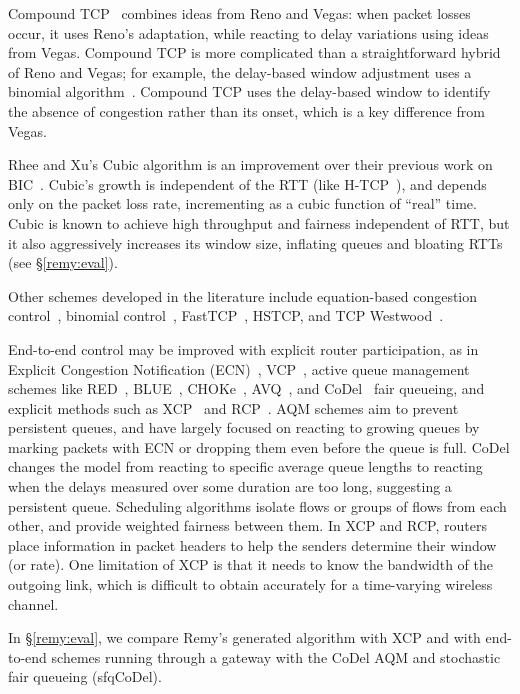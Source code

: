 Compound TCP~\cite{compound} combines ideas from Reno and Vegas: when
packet losses occur, it uses Reno's adaptation, while reacting to
delay variations using ideas from Vegas. Compound TCP is more
complicated than a straightforward hybrid of Reno and Vegas; for
example, the delay-based window adjustment uses a binomial
algorithm~\cite{binomial}. Compound TCP uses the delay-based window to
identify the absence of congestion rather than its onset, which is a
key difference from Vegas.

Rhee and Xu's Cubic algorithm is an improvement over their previous
work on BIC~\cite{bic}. Cubic's growth is independent of the RTT (like
H-TCP~\cite{htcp}), and depends only on the packet loss rate,
incrementing as a cubic function of ``real'' time. Cubic is known to
achieve high throughput and fairness independent of RTT, but it also
aggressively increases its window size, inflating queues and bloating
RTTs (see \S\ref{remy:eval}).

Other schemes developed in the literature include equation-based
congestion control~\cite{ebcc}, binomial control~\cite{binomial},
FastTCP~\cite{fasttcp}, HSTCP, and TCP Westwood~\cite{westwood}.

End-to-end control may be improved with explicit router participation,
as in Explicit Congestion Notification (ECN)~\cite{ecn},
VCP~\cite{vcp}, active queue management schemes like
RED~\cite{Floyd93}, BLUE~\cite{BLUE}, CHOKe~\cite{choke},
AVQ~\cite{AVQ}, and CoDel~\cite{CoDel} fair queueing, and explicit
methods such as XCP~\cite{xcp} and RCP~\cite{rcp}.  AQM schemes aim to
prevent persistent queues, and have largely focused on reacting to
growing queues by marking packets with ECN or dropping them even
before the queue is full. CoDel changes the model from reacting to
specific average queue lengths to reacting when the delays measured
over some duration are too long, suggesting a persistent
queue. Scheduling algorithms isolate flows or groups of flows from
each other, and provide weighted fairness between them.  In XCP and
RCP, routers place information in packet headers to help the senders
determine their window (or rate). One limitation of XCP is that it
needs to know the bandwidth of the outgoing link, which is difficult
to obtain accurately for a time-varying wireless channel.

In \S\ref{remy:eval}, we compare Remy's generated algorithm with XCP and
with end-to-end schemes running through a gateway with the CoDel AQM and
stochastic fair queueing (sfqCoDel).

